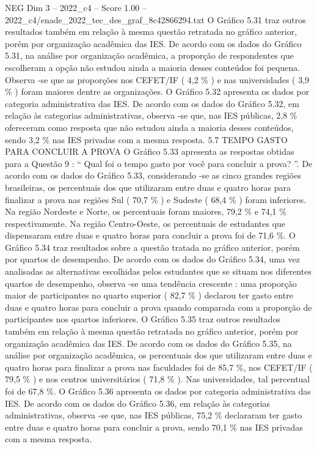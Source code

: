 \begin{textsample}{NEG Dim 3 – 2022\_c4 – Score 1.00 – 2022\_c4/enade\_2022\_tec\_des\_graf\_8c42866294.txt}
O Gráfico 5.31 traz outros resultados também em relação à mesma questão retratada no gráfico anterior, porém por organização acadêmica das IES.
De acordo com os dados do Gráfico 5.31, na análise por organização acadêmica, a proporção de respondentes que escolheram a opção não estudou ainda a maioria desses conteúdos foi pequena.
Observa -se que as proporções nos CEFET/IF ( 4,2 \% ) e nas universidades ( 3,9 \% ) foram maiores dentre as organizações.
O Gráfico 5.32 apresenta os dados por categoria administrativa das IES.
De acordo com os dados do Gráfico 5.32, em relação às categorias administrativas, observa -se que, nas IES públicas, 2,8 \% ofereceram como resposta que não estudou ainda a maioria desses conteúdos, sendo 3,2 \% nas IES privadas com a mesma resposta. 5.7 TEMPO GASTO PARA CONCLUIR A PROVA O Gráfico 5.33 apresenta as respostas obtidas para a Questão 9 : “ Qual foi o tempo gasto por você para concluir a prova? ”.
De acordo com os dados do Gráfico 5.33, considerando -se as cinco grandes regiões brasileiras, os percentuais dos que utilizaram entre duas e quatro horas para finalizar a prova nas regiões Sul ( 70,7 \% ) e Sudeste ( 68,4 \% ) foram inferiores.
Na região Nordeste e Norte, os percentuais foram maiores, 79,2 \% e 74,1 \% respectivamente.
Na região Centro-Oeste, os percentuais de estudantes que dispensaram entre duas e quatro horas para concluir a prova foi de 71,6 \%.
O Gráfico 5.34 traz resultados sobre a questão tratada no gráfico anterior, porém por quartos de desempenho.
De acordo com os dados do Gráfico 5.34, uma vez analisadas as alternativas escolhidas pelos estudantes que se situam nos diferentes quartos de desempenho, observa -se uma tendência crescente : uma proporção maior de participantes no quarto superior ( 82,7 \% ) declarou ter gasto entre duas e quatro horas para concluir a prova quando comparada com a proporção de participantes nos quartos inferiores.
O Gráfico 5.35 traz outros resultados também em relação à mesma questão retratada no gráfico anterior, porém por organização acadêmica das IES.
De acordo com os dados do Gráfico 5.35, na análise por organização acadêmica, os percentuais dos que utilizaram entre duas e quatro horas para finalizar a prova nas faculdades foi de 85,7 \%, nos CEFET/IF ( 79,5 \% ) e nos centros universitários ( 71,8 \% ).
Nas universidades, tal percentual foi de 67,8 \%.
O Gráfico 5.36 apresenta os dados por categoria administrativa das IES.
De acordo com os dados do Gráfico 5.36, em relação às categorias administrativas, observa -se que, nas IES públicas, 75,2 \% declararam ter gasto entre duas e quatro horas para concluir a prova, sendo 70,1 \% nas IES privadas com a mesma resposta.

\end{textsample}
